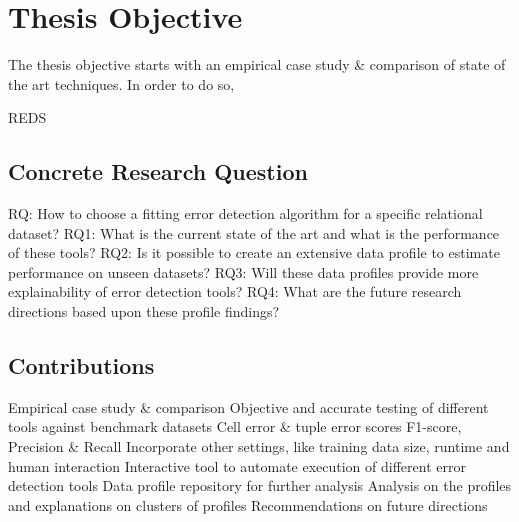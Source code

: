 \section{Thesis Objective}

The thesis objective starts with an empirical case study \& comparison of state of the art techniques. In order to do so, 

%
%
%
%
REDS \cite{Mahdavi2019-pk}
% 
% 
% 
% 


\subsection*{Concrete Research Question} %

\begin{outline}
    \1 RQ: How to choose a fitting error detection algorithm for a specific relational dataset?
        \2 RQ1: What is the current state of the art and what is the performance of these tools?
        \2 RQ2: Is it possible to create an extensive data profile to estimate performance on unseen datasets?
        \2 RQ3: Will these data profiles provide more explainability of error detection tools?
        \2 RQ4: What are the future research directions based upon these profile findings?
\end{outline}


\subsection*{Contributions} %

\begin{outline}
    \1 Empirical case study \& comparison
        \2 Objective and accurate testing of different tools against benchmark datasets
        \2 Cell error \& tuple error scores
        \2 F1-score, Precision \& Recall
        \2 Incorporate other settings, like training data size, runtime and human interaction
    \1 Interactive tool to automate execution of different error detection tools
    \1 Data profile repository for further analysis
        \2 Analysis on the profiles and explanations on clusters of profiles
    \1 Recommendations on future directions
\end{outline}